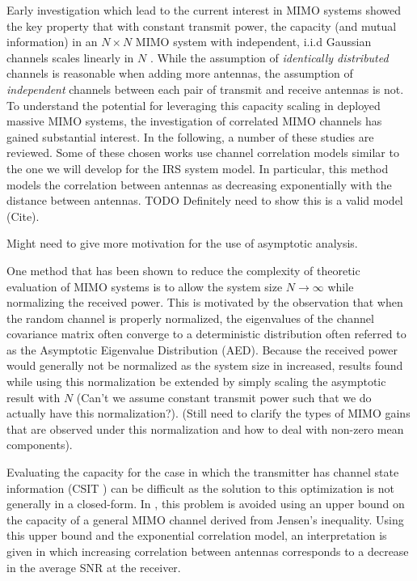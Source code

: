 \par
Early investigation which lead to the current interest in MIMO systems showed the key property that with constant transmit power, the capacity (and mutual information) in an $N \times N$ MIMO system with independent, i.i.d Gaussian channels scales linearly in $N$ \cite{foschini1998limits}. While the assumption of \emph{identically distributed} channels is reasonable when adding more antennas, the assumption of \emph{independent} channels between each pair of transmit and receive antennas is not. To understand the potential for leveraging this capacity scaling in deployed massive MIMO systems, the investigation of correlated MIMO channels has gained substantial interest. In the following, a number of these studies are reviewed. Some of these chosen works use channel correlation models similar to the one we will develop for the IRS system model. In particular, this method models the correlation between antennas as decreasing  exponentially with the distance between antennas. TODO Definitely need to show this is a valid model (Cite).
\par
Might need to give more motivation for the use of asymptotic analysis.
\par
One method that has been shown to reduce the complexity of theoretic evaluation of MIMO systems is to allow the system size $N \rightarrow \infty$ while normalizing the received power. 
This is motivated by the observation that when the random channel is properly normalized, the eigenvalues of the channel covariance matrix often converge to a deterministic distribution often referred to as the Asymptotic Eigenvalue Distribution (AED). 
Because the received power would generally not be normalized as the system size in increased, results found while using this normalization be extended by simply scaling the asymptotic result with $N$ (Can't we assume constant transmit power such that we do actually have this normalization?).
(Still need to clarify the types of MIMO gains that are observed under this normalization and how to deal with non-zero mean components).
\par
Evaluating the capacity for the case in which the transmitter has channel state information (CSIT ) can be difficult as the solution to this optimization is not generally in a closed-form. In \cite{loyka2001channel}, this problem is avoided using an upper bound on the capacity of a general MIMO channel derived from Jensen's inequality. Using this upper bound and the exponential correlation model, an interpretation is given in which increasing correlation between antennas corresponds to a decrease in the average SNR at the receiver. 
